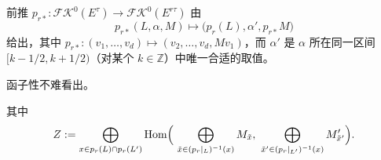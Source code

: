 \documentclass[11pt,a4paper]{article}
\theoremstyle{plain}
\theoremstyle{definition}
\begin{document}

前推 $p_{r*}:\mathcal{FK}^0(E^\tau)\to\mathcal{FK}^0(E^{r\tau})$ 由
\[
p_{r*}(L,\alpha,M)\mapsto\bigl(p_r(L),\alpha',p_{r*}M\bigr)
\]
给出，其中 $p_{r*}:(v_1,\dots,v_d)\mapsto(v_2,\dots,v_d,Mv_1)$，而 $\alpha'$ 是 $\alpha$ 所在同一区间 $[k-1/2,k+1/2)$（对某个 $k\in\mathbb{Z}$）中唯一合适的取值。

函子性不难看出。
其中
\[
Z:=\bigoplus_{x\in p_r(L)\cap p_r(L')}\operatorname{Hom}\Bigl(\ \bigoplus_{\tilde{x}\in(p_r|_{L})^{-1}(x)}M_{\tilde{x}},\ \bigoplus_{\tilde{x}'\in(p_r|_{L'})^{-1}(x)}M'_{\tilde{x}'}\Bigr).
\]

\end{document}
